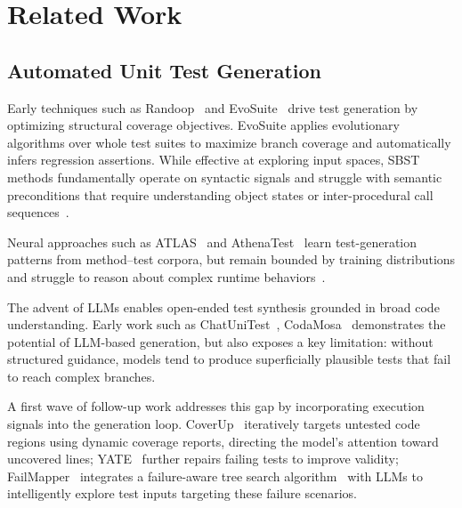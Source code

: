 \section{Related Work}

\subsection{Automated Unit Test Generation}

Early techniques such as Randoop~\cite{randoop} and EvoSuite~\cite{evosuite} drive test generation by optimizing structural coverage objectives. EvoSuite applies evolutionary algorithms over whole test suites to maximize branch coverage and automatically infers regression assertions. While effective at exploring input spaces, SBST methods fundamentally operate on syntactic signals and struggle with semantic preconditions that require understanding object states or inter-procedural call sequences~\cite{mcminn2011}.

Neural approaches such as ATLAS~\cite{watson2020atalas} and AthenaTest~\cite{Tufano2020UnitTC} learn test-generation patterns from method--test corpora, but remain bounded by training distributions and struggle to reason about complex runtime behaviors~\cite{allamanis2018ml4code}.

The advent of LLMs enables open-ended test synthesis grounded in broad code understanding. Early work such as ChatUniTest~\cite{chen2024}, CodaMosa~\cite{lemieux2023codamosa} demonstrates the potential of LLM-based generation, but also exposes a key limitation: without structured guidance, models tend to produce superficially plausible tests that fail to reach complex branches.

A first wave of follow-up work addresses this gap by incorporating execution signals into the generation loop. CoverUp~\cite{pizzorno2025} iteratively targets untested code regions using dynamic coverage reports, directing the model's attention toward uncovered lines; YATE~\cite{konstantinou2025yate} further repairs failing tests to improve validity; FailMapper~\cite{dong2025failmapper} integrates a failure-aware tree search algorithm~\cite{xie2024montecarlotreesearch} with LLMs to intelligently explore test inputs targeting these failure scenarios.

